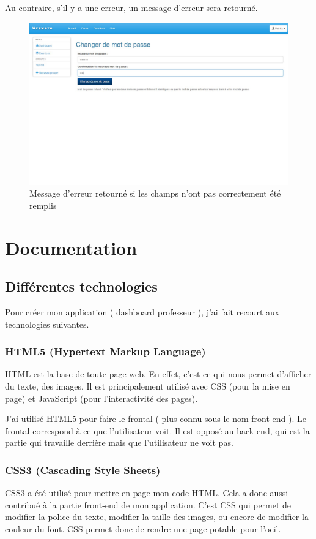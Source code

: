 \documentclass[letterpaper,10pt,french]{sphinxmanual}
\begin{document}
Au contraire, s'il y a une erreur, un message d'erreur sera retourné.
\begin{figure}[htbp]
\centering
\capstart

\includegraphics[width=0.700\linewidth]{passwordFail.jpg}
\caption{Message d'erreur retourné si les champs n'ont pas correctement été remplis}\end{figure}


\chapter{Documentation}
\label{documentation:documentation}\label{documentation::doc}

\section{Différentes technologies}
\label{documentation:differentes-technologies}
Pour créer mon application ( dashboard professeur ), j'ai fait recourt aux
technologies suivantes.


\subsection{HTML5 (Hypertext Markup Language)}
\label{documentation:html5-hypertext-markup-language}
HTML est la base de toute page web. En effet, c'est ce qui nous permet
d'afficher du texte, des images. Il est principalement utilisé avec CSS (pour la
mise en page) et JavaScript (pour l'interactivité des pages).

J'ai utilisé HTML5 pour faire le frontal ( plus connu sous le nom front-end ).
Le frontal correspond à ce que l'utilisateur voit. Il est opposé au back-end,
qui est la partie qui travaille derrière mais que l'utilisateur ne voit pas.


\subsection{CSS3 (Cascading Style Sheets)}
\label{documentation:css3-cascading-style-sheets}
CSS3 a été utilisé pour mettre en page mon code HTML. Cela a donc aussi
contribué à la partie front-end de mon application. C'est CSS qui permet de
modifier la police du texte, modifier la taille des images, ou encore
de modifier la couleur du font. CSS permet donc de rendre une page potable
pour l'oeil.
\end{document}
